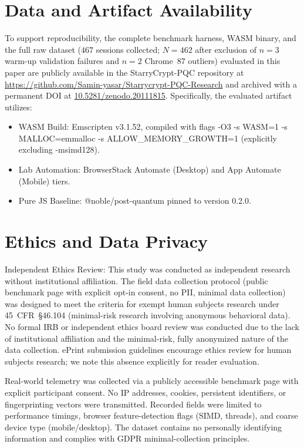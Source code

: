 \documentclass[11pt,a4paper]{article}
\def\textbf#1{#1}%
\def\texttt#1{#1}%
\begin{document}
\section*{Data and Artifact Availability}
\noindent
To support reproducibility, the complete benchmark harness, WASM binary, and the full raw dataset ($467$ sessions collected; $N=462$ after exclusion of $n=3$ warm-up validation failures and $n=2$ Chrome~87 outliers) evaluated in this paper are publicly available in the StarryCrypt-PQC repository at \url{https://github.com/Samin-yasar/Starrycrypt-PQC-Research} and archived with a permanent DOI at \href{https://doi.org/10.5281/zenodo.20111815}{10.5281/zenodo.20111815}.  Specifically, the evaluated artifact utilizes:
\begin{itemize}
    \item \textbf{WASM Build:} Emscripten v3.1.52, compiled with flags \texttt{-O3 -s WASM=1 -s MALLOC=emmalloc -s ALLOW\_MEMORY\_GROWTH=1} (explicitly excluding \texttt{-msimd128}).
    \item \textbf{Lab Automation:} BrowserStack Automate (Desktop) and App Automate (Mobile) tiers.
    \item \textbf{Pure JS Baseline:} \texttt{@noble/post-quantum} pinned to version \texttt{0.2.0}.
\end{itemize}

\section*{Ethics and Data Privacy}
\noindent
\textbf{Independent Ethics Review:} This study was conducted as independent research without institutional affiliation. The field data collection protocol (public benchmark page with explicit opt-in consent, no PII, minimal data collection) was designed to meet the criteria for exempt human subjects research under 45~CFR~\S46.104 (minimal-risk research involving anonymous behavioral data). No formal IRB or independent ethics board review was conducted due to the lack of institutional affiliation and the minimal-risk, fully anonymized nature of the data collection. ePrint submission guidelines encourage ethics review for human subjects research; we note this absence explicitly for reader evaluation.

Real-world telemetry was collected via a publicly accessible benchmark page with explicit participant consent. No IP addresses, cookies, persistent identifiers, or fingerprinting vectors were transmitted. Recorded fields were limited to performance timings, browser feature-detection flags (SIMD, threads), and coarse device type (mobile/desktop). The dataset contains no personally identifying information and complies with GDPR minimal-collection principles.
\end{document}
